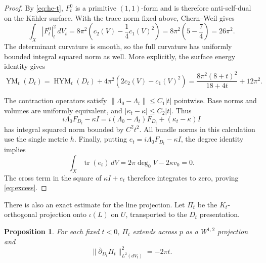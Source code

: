\documentclass[11pt]{amsart}
\newtheorem{proposition}[theorem]{Proposition}
\theoremstyle{definition}
\theoremstyle{remark}
\newcommand{\db}{\bar\partial}
\newcommand{\tr}{\operatorname{tr}}
\newcommand{\HYM}{\operatorname{HYM}}
\newcommand{\YM}{\operatorname{YM}}
\begin{document}
\begin{proof}
By \eqref{eq:he-t}, $F_t^0$ is a primitive $(1,1)$-form and is
therefore anti-self-dual on the K\"ahler surface. With the trace norm
fixed above, Chern--Weil gives
\[
 \int_X|F_t^0|_t^2\,dV_t
 =8\pi^2\left(c_2(V)-\frac14c_1(V)^2\right)
 =8\pi^2\left(5-\frac74\right)=26\pi^2.
\]
The determinant curvature is smooth, so the full curvature has uniformly
bounded integral squared norm as well. More explicitly, the surface
energy identity gives
\begin{equation}\label{eq:full-energy}
 \YM_t(D_t)
 =\HYM_t(D_t)+4\pi^2(2c_2(V)-c_1(V)^2)
 =\frac{8\pi^2(8+t)^2}{18+4t}+12\pi^2.
\end{equation}

The contraction operators satisfy $\|\Lambda_0-\Lambda_t\|\le C_1|t|$
pointwise. Base norms and volumes are uniformly equivalent, and
$|\kappa_t-\kappa|\le C_2|t|$. Thus
\[
 i\Lambda_0F_{D_t}-\kappa I
 =i(\Lambda_0-\Lambda_t)F_{D_t}+(\kappa_t-\kappa)I
\]
has integral squared norm bounded by $C^2t^2$.
All bundle norms in this calculation use the single metric $h$.
Finally, putting $e_t=i\Lambda_0F_{D_t}-\kappa I$, the degree identity
implies
\[
 \int_X\tr(e_t)\,dV=2\pi\deg_0V-2\kappa v_0=0.
\]
The cross term in the square of $\kappa I+e_t$ therefore integrates
to zero, proving \eqref{eq:excess}.
\end{proof}

There is also an exact estimate for the line projection. Let $\Pi_t$
be the $K_t$-orthogonal projection onto $\iota(L)$ on $U$, transported
to the $D_t$ presentation.

\begin{proposition}\label{prop:projection}
For each fixed $t<0$, $\Pi_t$ extends across $p$ as a $W^{1,2}$
projection and
\begin{equation}\label{eq:projection-energy}
 \|\db_{D_t}\Pi_t\|_{L^2(dV_t)}^2=-2\pi t.
\end{equation}
\end{proposition}
\end{document}
